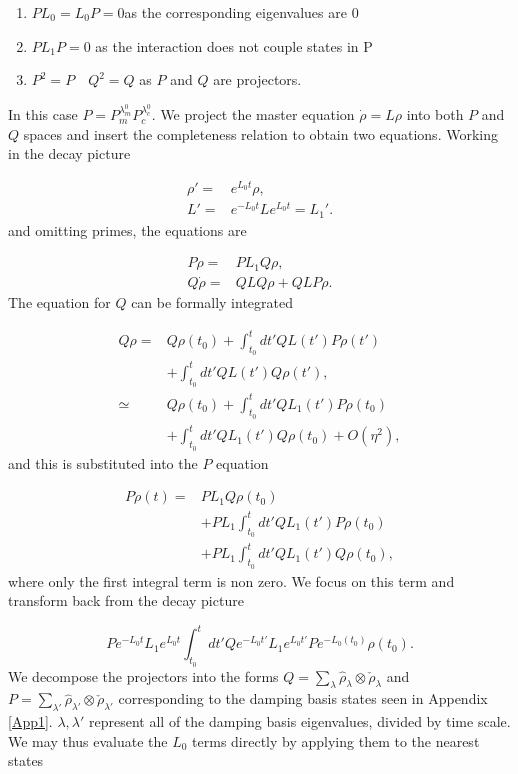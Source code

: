 \documentclass[reprint, amsmath,amssymb, aps,pra]{revtex4-1}
\begin{document}
\begin{enumerate}

\item $ PL_{0} = L_{0}P = 0 $\qquad as the corresponding eigenvalues are 0

\item $PL_{1}P=0$ \qquad as the interaction does not couple states in P

\item $P^2 = P \quad Q^2 = Q$ \qquad as $P$ and $Q$ are projectors.
\end{enumerate} In this case $P=P_m^{\lambda_m^0}P_c^{\lambda_c^0}$. We project the master equation $\dot{\rho}=L\rho$ into both $P$ and $Q$ spaces and insert the completeness relation to obtain two equations. Working in the decay picture

\begin{align*}
 \rho' =& e^{L_0t}\rho,\\
 L' =& e^{-L_0t}Le^{L_0t} = L_1'.
\end{align*} and omitting primes, the equations are

\begin{align*}
P\dot{\rho} =& PL_1Q\rho, \\
Q\dot{\rho} =& QLQ\rho + QLP\rho.
\end{align*} The equation for $Q$ can be formally integrated \cite{TesisMaestria}

\begin{align*}
Q\rho =& Q\rho(t_0) + \int_{t_0}^{t}dt' QL(t')P\rho(t')\\
       &+\int_{t_0}^{t}dt'QL(t')Q\rho(t'),\\
\simeq & Q\rho(t_0) + \int_{t_0}^{t}dt' QL_1(t')P\rho(t_0)\\
       &+\int_{t_0}^{t}dt'QL_1(t')Q\rho(t_0)+O(\eta^2),
\end{align*} and this is substituted into the $P$ equation

\begin{align}
P\dot{\rho}(t) =& PL_1Q\rho(t_0)\\ 
 &+ PL_1\int_{t_0}^{t}dt' QL_1(t')P\rho(t_0)\nonumber \\
 &+ PL_1\int_{t_0}^{t}dt'QL_1(t')Q\rho(t_0) \nonumber,
\end{align} where only the first integral term is non zero. We focus on this term and transform back from the decay picture

\begin{equation}
P e^{-L_0 t}L_1e^{L_0 t}\int_{t_0}^{t}dt'Qe^{-L_0 t'}L_1e^{L_0 t'}Pe^{-L_0(t_0)}\rho(t_0).
\end{equation} We decompose the projectors into the forms $Q=\sum_\lambda \hat{\rho}_\lambda \otimes \check{\rho}_\lambda$ and $P=\sum_{\lambda'} \hat{\rho}_{\lambda'} \otimes \check{\rho}_{\lambda'}$ corresponding to the damping basis states seen in Appendix \ref{App1}. $\lambda, \lambda'$ represent all of the damping basis eigenvalues, divided by time scale. We may thus evaluate the $L_0$ terms directly by applying them to the nearest states
\end{document}
